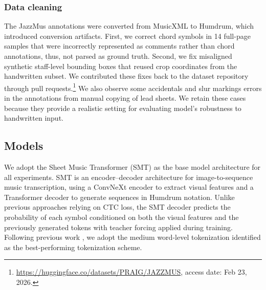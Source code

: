 \documentclass{article}
\newcommand{\question}[1]{\textcolor{yellow}{#1}}
\begin{document}
\subsubsection{Data cleaning}
\label{sec:data cleaning}
The JazzMus annotations were converted from MusicXML to Humdrum, which introduced conversion artifacts. First, we correct chord symbols in 14 full-page samples that were incorrectly represented as comments rather than chord annotations, thus, not parsed as ground truth. Second, we fix misaligned synthetic staff-level bounding boxes that reused crop coordinates from the handwritten subset. We contributed these fixes back to the dataset repository through pull requests.\footnote{\url{https://huggingface.co/datasets/PRAIG/JAZZMUS}, access date: Feb 23, 2026.}
We also observe some accidentals and slur markings errors in the annotations from manual copying of lead sheets. We retain these cases because they provide a realistic setting for evaluating model's robustness to handwritten input.

\subsection{Models}
We adopt the Sheet Music Transformer (SMT) \cite{rios-vila_sheet_2024} as the base model architecture for all experiments. SMT is an encoder–decoder architecture for image-to-sequence music transcription, using a ConvNeXt encoder to extract visual features and a Transformer decoder to generate sequences in Humdrum notation. Unlike previous approaches relying on CTC loss, the SMT decoder predicts the probability of each symbol conditioned on both the visual features and the previously generated tokens with teacher forcing applied during training. Following previous work \cite{martinez-sevilla_optical_2025}, we adopt the medium word-level tokenization identified as the best-performing tokenization scheme.
\end{document}
